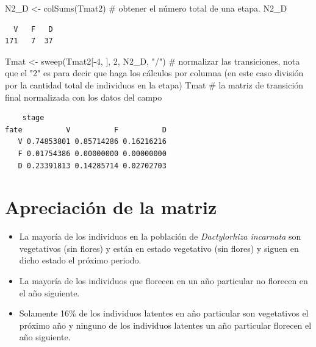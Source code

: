 \documentclass[
  12pt,
  letterpaper,
]{book}
\newenvironment{Shaded}{\begin{snugshade}}{\end{snugshade}}
\newcommand{\CommentTok}[1]{\textcolor[rgb]{0.37,0.37,0.37}{#1}}
\newcommand{\DecValTok}[1]{\textcolor[rgb]{0.68,0.00,0.00}{#1}}
\newcommand{\FunctionTok}[1]{\textcolor[rgb]{0.28,0.35,0.67}{#1}}
\newcommand{\NormalTok}[1]{\textcolor[rgb]{0.00,0.23,0.31}{#1}}
\newcommand{\OtherTok}[1]{\textcolor[rgb]{0.00,0.23,0.31}{#1}}
\newcommand{\SpecialCharTok}[1]{\textcolor[rgb]{0.37,0.37,0.37}{#1}}
\newcommand{\StringTok}[1]{\textcolor[rgb]{0.13,0.47,0.30}{#1}}
\providecommand{\tightlist}{%
  \setlength{\itemsep}{0pt}\setlength{\parskip}{0pt}}\usepackage{longtable,booktabs,array}
\begin{document}
\begin{Shaded}
\begin{Highlighting}[]
\NormalTok{N2\_D }\OtherTok{\textless{}{-}} \FunctionTok{colSums}\NormalTok{(Tmat2) }\CommentTok{\# obtener el número total de una etapa.}
\NormalTok{N2\_D}
\end{Highlighting}
\end{Shaded}

\begin{verbatim}
  V   F   D 
171   7  37 
\end{verbatim}

\begin{Shaded}
\begin{Highlighting}[]
\NormalTok{Tmat }\OtherTok{\textless{}{-}} \FunctionTok{sweep}\NormalTok{(Tmat2[}\SpecialCharTok{{-}}\DecValTok{4}\NormalTok{, ], }\DecValTok{2}\NormalTok{, N2\_D, }\StringTok{"/"}\NormalTok{) }\CommentTok{\# normalizar las transiciones, nota que el "2" es para decir que haga los cálculos por columna (en este caso división por la cantidad total de individuos en la etapa)}
\NormalTok{Tmat }\CommentTok{\# la matriz de transición final normalizada con los datos del campo}
\end{Highlighting}
\end{Shaded}

\begin{verbatim}
    stage
fate          V          F          D
   V 0.74853801 0.85714286 0.16216216
   F 0.01754386 0.00000000 0.00000000
   D 0.23391813 0.14285714 0.02702703
\end{verbatim}

\section{Apreciación de la matriz}\label{apreciaciuxf3n-de-la-matriz}

\begin{itemize}
\tightlist
\item
  La mayoría de los individuos en la población de \emph{Dactylorhiza
  incarnata} son vegetativos (sin flores) y están en estado vegetativo
  (sin flores) y siguen en dicho estado el próximo periodo.
\item
  La mayoría de los individuos que florecen en un año particular no
  florecen en el año siguiente.
\item
  Solamente 16\% de los individuos latentes en año particular son
  vegetativos el próximo año y ninguno de los individuos latentes un año
  particular florecen el año siguiente.
\end{itemize}
\end{document}

